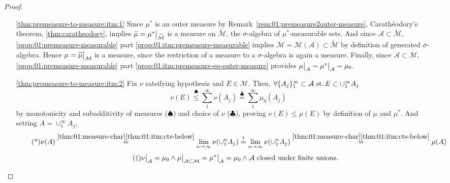 \begin{proof}\
  \begin{itemize}
  \item[\ref{thm:premeasure-to-measure:itm:1}]
    Since $\mu^*$ is an outer measure by
    Remark~\ref{rem:01:premeasure2outer-measure},
    Carath\'eodory's theorem, \ref{thm:caratheodory}, implies
    $\widetilde{\mu} = \restr{\mu^*}{\widetilde{\mathcal{M}}}$
    is a measure on $\widetilde{\mathcal{M}}$, the $\sigma$-algebra
    of $\mu^*$-measurable sets.
    And since $\mathcal A\subset \widetilde{\mathcal{M}}$,
    \ref{prop:01:premeasure-measurable} part
    \ref{prop:01:itm:premeasure-measurable} implies
    $\mathcal M = \mathcal M(\mathcal A) \subset \widetilde{\mathcal{M}}$
    by definition of generated $\sigma$-algebra.
    Hence ${\mu = \restr{\widetilde{\mu}}{\mathcal M}}$
    is a measure, since the restriction of a measure to a
    $\sigma$-algebra is again a measure.
    Finally, since $\mathcal A\subset \mathcal M$,
    \ref{prop:01:premeasure-measurable} part
    \ref{prop:01:itm:premeasure-eq-outer-measure} provides
    $\restr{\mu}{\mathcal A} = \restr{\mu^*}{\mathcal A} = \mu_0$.
  \item[\ref{thm:premeasure-to-measure:itm:2}]
    Fix $\nu$ satsifying hypothesis and $E\in\mathcal M$. Then,
    ${\forall \{A_j\}_1^\infty\subset\mathcal A \operatorname{\,st.}
      E\subset\cup_1^\infty A_j}$
    \[
    \nu(E) \stackrel{\spadesuit}{\leq} \sum_1^\infty \nu(A_j)
    \stackrel{\clubsuit}{=} \sum_1^\infty \mu_0(A_j)
    \]
    by monotonicity and subadditivity of measures ($\spadesuit$)
    and choice of $\nu$ ($\clubsuit$), proving
    $\nu(E)\leq\mu(E)$ by definition of $\mu$ and $\mu^*$.
    And setting $A=\cup_1^\infty A_j$,
    \begin{equation*}
      \tag{*}
      \nu(A) \stackrel{
        \ref{thm:01:measure-char}\ref{thm:01:itm:cts-below}}{
        =} \lim_{n\rightarrow\infty}\nu(\cup_1^n A_j)
      \stackrel{\dag}{=} \lim_{n\rightarrow\infty}\nu(\cup_1^n A_j)
      \stackrel{
        \ref{thm:01:measure-char}\ref{thm:01:itm:cts-below}}{
        =} \mu(A)
    \end{equation*}
    \begin{equation*}
      \tag{\dag}
      \restr{\nu}{\mathcal A} = \mu_0 \land
      \restr{\mu}{\mathcal A\subset\mathcal M}
      = \restr{\mu^*}{\mathcal A} = \mu_0 \land
      \mathcal{A}\text{ closed under finite unions}.
    \end{equation*}

\end{itemize}
\end{proof}
